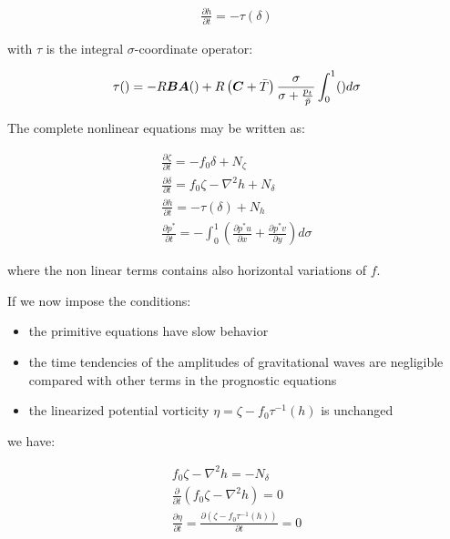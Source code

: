 \begin{gather}
  \frac{\partial h}{\partial t} = - \tau(\delta)
\end{gather}

with $\tau$ is the integral $\sigma$-coordinate operator:

\begin{gather}
  \tau( ) = -R \bm{B}\bm{A}( ) + R \left( \bm{C} + \bar{T} \right)
    \frac{\sigma}{\sigma + \frac{p_t}{\bar{p}}}
    \int_0^1 ( ) d\sigma
\end{gather}

The complete nonlinear equations may be written as:

\begin{gather}
  \label{cmplnonlin1}
  \frac{\partial \zeta}{\partial t} = -f_0 \delta + N_{\zeta} \\
  \label{cmplnonlin2}
  \frac{\partial \delta}{\partial t} = f_0 \zeta -
     \nabla^2 h + N_{\delta} \\
  \label{cmplnonlin3}
  \frac{\partial h}{\partial t} = - \tau(\delta) + N_{h} \\
  \frac{\partial p^{\ast}}{\partial t} = -
     \int_0^1 \left(\frac{\partial p^{\ast}u}{\partial x} +
     \frac{\partial p^{\ast} v}{\partial y} \right) d\sigma
\end{gather}

where the non linear terms contains also horizontal variations of $f$.

If we now impose the conditions:

\begin{itemize}
  \item the primitive equations have slow behavior
  \item the time tendencies of the amplitudes of gravitational waves are
    negligible compared with other terms in the prognostic equations
  \item the linearized potential vorticity
    $\eta = \zeta - f_0 \tau^{-1}(h)$ is unchanged
\end{itemize}

we have:

\begin{gather}
  f_0 \zeta - \nabla^2 h = -N_{\delta} \\
  \frac{\partial}{\partial t}\left( f_0 \zeta - \nabla^2 h\right) = 0 \\
  \frac{\partial \eta}{\partial t} = 
   \frac{\partial \left(\zeta - f_0 \tau^{-1}(h)\right)}{\partial t} = 0
\end{gather}

